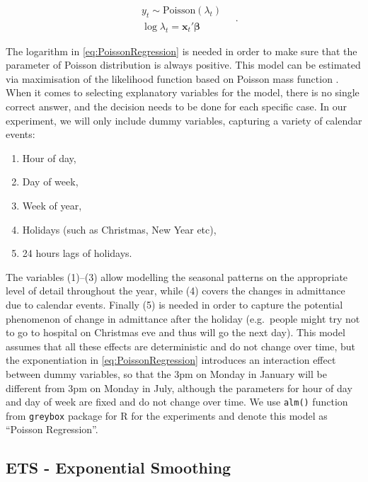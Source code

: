 \documentclass[]{elsarticle} %
\providecommand{\tightlist}{%
  \setlength{\itemsep}{0pt}\setlength{\parskip}{0pt}}
\begin{document}
\begin{equation}
  \begin{aligned}
    & {y}_t \sim \mathrm{Poisson} \left( \lambda_t \right) \\
    & \log \lambda_t = \mathbf{x}_t' \boldsymbol{\beta}
  \end{aligned} \quad .
\label{eq:PoissonRegression}
\end{equation}

The logarithm in \eqref{eq:PoissonRegression} is needed in order to make sure that the parameter of Poisson distribution is always positive. This model can be estimated via maximisation of the likelihood function based on Poisson mass function . When it comes to selecting explanatory variables for the model, there is no single correct answer, and the decision needs to be done for each specific case. In our experiment, we will only include dummy variables, capturing a variety of calendar events:

\begin{enumerate}
\def\labelenumi{\arabic{enumi}.}
\tightlist
\item
  Hour of day,
\item
  Day of week,
\item
  Week of year,
\item
  Holidays (such as Christmas, New Year etc),
\item
  24 hours lags of holidays.
\end{enumerate}

The variables (1)--(3) allow modelling the seasonal patterns on the appropriate level of detail throughout the year, while (4) covers the changes in admittance due to calendar events. Finally (5) is needed in order to capture the potential phenomenon of change in admittance after the holiday (e.g.~people might try not to go to hospital on Christmas eve and thus will go the next day). This model assumes that all these effects are deterministic and do not change over time, but the exponentiation in \eqref{eq:PoissonRegression} introduces an interaction effect between dummy variables, so that the 3pm on Monday in January will be different from 3pm on Monday in July, although the parameters for hour of day and day of week are fixed and do not change over time. We use \texttt{alm()} function from \texttt{greybox} package \citep{Svetunkov2021Greybox} for R \citep{RTeam2021} for the experiments and denote this model as ``Poisson Regression''.

\hypertarget{ets---exponential-smoothing}{%
\subsection{ETS - Exponential Smoothing}\label{ets---exponential-smoothing}}
\end{document}
